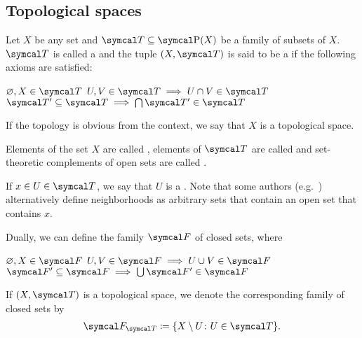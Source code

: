 \subsection{Topological spaces}\label{sec:topological_spaces}

\begin{definition}\label{def:topological_space}\cite[11]{Engelking1989}
  Let \( X \) be any set and \( \Cal{T} \subseteq \Power(X) \) be a family of subsets of \( X \). \( \Cal{T} \) is called a  and the tuple \( (X, \Cal{T}) \) is said to be a  if the following axioms are satisfied:
  \begin{description}
     \( \varnothing, X \in \Cal{T} \)
     \( U, V \in \Cal{T} \implies U \cap V \in \Cal{T} \)
     \( \Cal{T}' \subseteq \Cal{T} \implies \bigcap \Cal{T}' \in \Cal{T} \)
  \end{description}

  If the topology is obvious from the context, we say that \( X \) is a topological space.

  Elements of the set \( X \) are called , elements of \( \Cal{T} \) are called  and set-theoretic complements of open sets are called .

  If \( x \in U \in \Cal{T} \), we say that \( U \) is a . Note that some authors (e.g.~\cite[38]{Kelley1955}) alternatively define neighborhoods as arbitrary sets that contain an open set that contains \( x \).

  Dually, we can define the family \( \Cal{F} \) of closed sets, where
  \begin{description}
     \( \varnothing, X \in \Cal{F} \)
     \( U, V \in \Cal{F} \implies U \cup V \in \Cal{F} \)
     \( \Cal{F}' \subseteq \Cal{F} \implies \bigcup \Cal{F}' \in \Cal{F} \)
  \end{description}

  If \( (X, \Cal{T}) \) is a topological space, we denote the corresponding family of closed sets by
  \begin{align*}
    \Cal{F}_{\Cal{T}} \coloneqq \{ X \setminus U \colon U \in \Cal{T} \}.
  \end{align*}
\end{definition}

